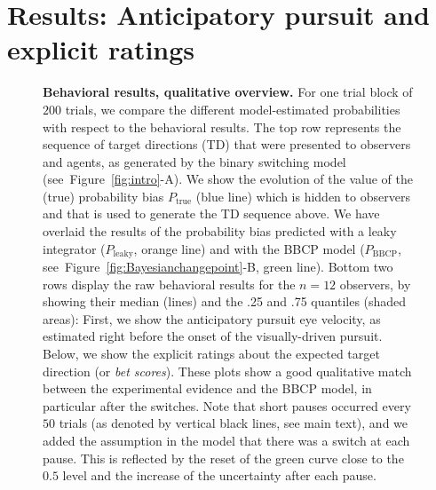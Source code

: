 \documentclass[10pt,letterpaper]{article}
\newcommand{\seeFig}[1]{Figure~\ref{fig:#1}}
\begin{document}
\section{Results: Anticipatory pursuit and explicit ratings}
\label{sec:results_psycho}
\begin{figure}%
\caption{
\textbf{Behavioral results, qualitative overview.} %
For one trial block of $200$ trials, we compare the different model-estimated probabilities with respect to the behavioral results.
The top row represents the sequence of target directions (TD)
that were presented to observers and agents,
as generated by the binary switching model (see~\seeFig{intro}-A).
We show the evolution of the value
of the (true) probability bias $P_{\text{true}}$ (blue line)
which is hidden to observers
and that is used to generate the TD sequence above.
We have overlaid the results of
the probability bias predicted with a leaky integrator ($P_{\text{leaky}}$, orange line)
and with the BBCP model ($P_{\text{BBCP}}$, see~\seeFig{Bayesianchangepoint}-B, green line).
Bottom two rows display the raw behavioral results
for the $n=12$ observers, by showing their median (lines) and the .25 and .75 quantiles (shaded areas):
First, we show the  anticipatory pursuit eye velocity, as estimated right before
the onset of the visually-driven pursuit.
Below, we show the explicit ratings about the expected target direction (or \textit{bet scores}).
These plots show a good qualitative match between
the experimental evidence and the BBCP model,
in particular after the switches.
Note that short pauses occurred every $50$ trials
(as denoted by vertical black lines, see main text),
and we added the assumption in the model
that there was a switch at each pause.
This is reflected by the reset of the green curve close to the $0.5$ level and
the increase of the uncertainty after each pause. %
}
\label{fig:results_psycho}
\end{figure}
\end{document}
